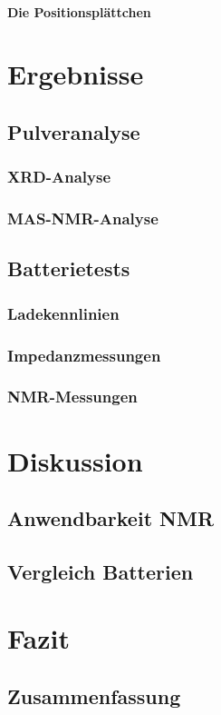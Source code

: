 \documentclass[a4paper, 11pt, headsepline,footsepline,twoside,abstract]{scrbook}
\begin{document}
\subsubsection{Die Positionsplättchen}
\chapter{Ergebnisse}
\section{Pulveranalyse}
\subsection{XRD-Analyse}
\subsection{MAS-NMR-Analyse}
\section{Batterietests}
\subsection{Ladekennlinien}
\subsection{Impedanzmessungen}
\subsection{NMR-Messungen}
\chapter{Diskussion}
\section{Anwendbarkeit NMR}
\section{Vergleich Batterien}
\chapter{Fazit}
\section{Zusammenfassung}
\end{document}

